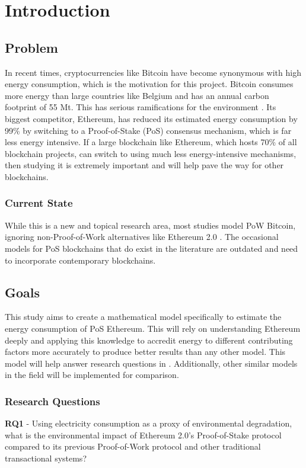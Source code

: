 \chapter{Introduction}

\section{Problem}
In recent times, cryptocurrencies like Bitcoin have become synonymous with high energy consumption, which is the motivation for this project. Bitcoin consumes more energy than large countries like Belgium and has an annual carbon footprint of 55 Mt. This has serious ramifications for the environment \cite{BitcoinDigiconomist}. Its biggest competitor, Ethereum, has reduced its estimated energy consumption by 99\% by switching to a Proof-of-Stake (PoS) consensus mechanism, which is far less energy intensive. If a large blockchain like Ethereum, which hosts 70\% of all blockchain projects, can switch to using much less energy-intensive mechanisms, then studying it is extremely important and will help pave the way for other blockchains. 

\subsection{Current State}
While this is a new and topical research area, most studies model PoW Bitcoin, ignoring non-Proof-of-Work alternatives like Ethereum 2.0 \cite{Lei2021BestRecommendations}. The occasional models for PoS blockchains that do exist in the literature are outdated and need to incorporate contemporary blockchains. 

\section{Goals}
This study aims to create a mathematical model specifically to estimate the energy consumption of PoS Ethereum. This will rely on understanding Ethereum deeply and applying this knowledge to accredit energy to different contributing factors more accurately to produce better results than any other model. This model will help answer research questions in . Additionally, other similar models in the field will be implemented for comparison.

\subsection{Research Questions}
\label{ResearchQuestions}
\textbf{RQ1} - Using electricity consumption as a proxy of environmental degradation, what is the environmental impact of Ethereum 2.0's Proof-of-Stake protocol compared to its previous Proof-of-Work protocol and other traditional transactional systems?

